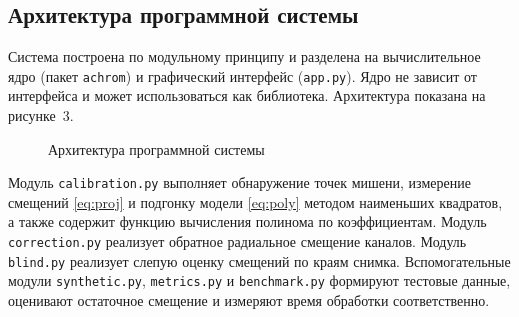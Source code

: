 \documentclass[a4paper,14pt,oneside]{extreport}
\begin{document}
\subsection{Архитектура программной системы}

Система построена по модульному принципу и разделена на вычислительное
ядро (пакет \texttt{achrom}) и графический интерфейс (\texttt{app.py}).
Ядро не зависит от интерфейса и может использоваться как библиотека.
Архитектура показана на рисунке~3.

\begin{figure}[H]
\centering
{}
\caption{Архитектура программной системы}
\label{fig:arch}
\end{figure}

Модуль \texttt{calibration.py} выполняет обнаружение точек мишени,
измерение смещений \eqref{eq:proj} и подгонку модели \eqref{eq:poly}
методом наименьших квадратов, а также содержит функцию вычисления
полинома по коэффициентам. Модуль \texttt{correction.py} реализует
обратное радиальное смещение каналов. Модуль \texttt{blind.py} реализует
слепую оценку смещений по краям снимка. Вспомогательные модули
\texttt{synthetic.py}, \texttt{metrics.py} и \texttt{benchmark.py}
формируют тестовые данные, оценивают остаточное смещение и измеряют время
обработки соответственно.
\end{document}
